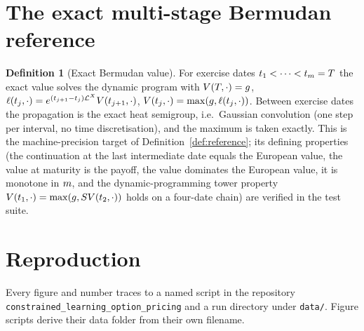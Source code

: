\documentclass[11pt]{article}
\newcommand{\heatSemigroup}{S}       %
\theoremstyle{plain}
\theoremstyle{definition}
\newtheorem{definition}[theorem]{Definition}
\theoremstyle{remark}
\begin{document}
\section{The exact multi-stage Bermudan reference}\label{app:exact}

\begin{definition}[Exact Bermudan value]\label{def:exact-bermudan}
For exercise dates $t_{1}<\dots<t_{m}=T$
the exact value solves the dynamic program with $V(T,\cdot)=g$,
$\ell(t_{j},\cdot)=e^{(t_{j+1}-t_{j})\mathcal{L}^{X}}V(t_{j+1},\cdot)$,
$V(t_{j},\cdot)=\max(g,\ell(t_{j},\cdot))$.
Between exercise dates the propagation is the exact heat semigroup, i.e.\ Gaussian
convolution (one step per interval, no time discretisation), and the maximum is
taken exactly. This is the machine-precision target of Definition~\ref{def:reference};
its defining properties (the continuation at the last intermediate date equals the
European value, the value at maturity is the payoff, the value dominates the
European value, it is monotone in $m$, and the dynamic-programming
tower property $\vFunction(\timePoint_1,\cdot)=\max(\payoff,\heatSemigroup\vFunction(\timePoint_2,\cdot))$
holds on a four-date chain) are verified in the test
suite.
\end{definition}

\section{Reproduction}\label{app:repro}

Every figure and number traces to a named script in the repository
\texttt{constrained\_learning\_option\_pricing} and a run directory under
\texttt{data/}. Figure scripts derive their data folder from their own filename.
\end{document}
